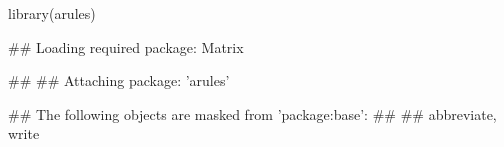\begin{Schunk}
% --begin: "casestudy-assoc-arules"
\begin{Sinput}
library(arules)
\end{Sinput}
\begin{Soutput}
## Loading required package: Matrix
\end{Soutput}
\begin{Soutput}
## 
## Attaching package: 'arules'
\end{Soutput}
\begin{Soutput}
## The following objects are masked from 'package:base':
## 
##     abbreviate, write
\end{Soutput}
\end{Schunk}
